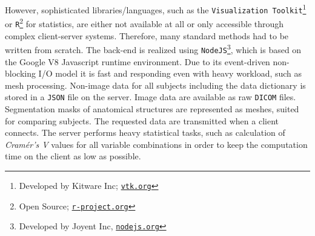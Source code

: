 \documentclass[journal]{style/vgtc} 			          %
\newcommand{\rem}[1]{\textcolor{red}{\sout{#1}}}
\begin{document}
%
However, sophisticated libraries/languages, such as the \texttt{Visualization Toolkit}\footnote{Developed by Kitware Inc; \href{http://vtk.org}{\texttt{vtk.org}}} or \texttt{R}\footnote{Open Source; \href{http://r-project.org}{\texttt{r-project.org}}} for statistics, are either not available at all or only accessible through complex client-server systems.
%
Therefore, many standard methods had to be written from scratch.
%
%
%
The back-end is realized using \texttt{NodeJS}\footnote{Developed by Joyent Inc, \href{http://nodejs.org}{\texttt{nodejs.org}}}, which is based on the Google V8 Javascript runtime environment.
%
Due to its event-driven non-blocking I/O model it is fast and responding even with heavy workload, such as mesh processing.
%
Non-image data for all subjects including the data dictionary is stored in a \texttt{JSON} file on the server.
%
Image data are available as raw \texttt{DICOM} files.
%
Segmentation masks of anatomical structures are represented as meshes, suited for comparing subjects.
%
The requested data are transmitted when a client connects.
%
The server performs heavy statistical tasks, such as calculation of \emph{Cram\'{e}r's V} values for all variable combinations in order to keep the computation time on the client as low as possible.
%
\end{document}
